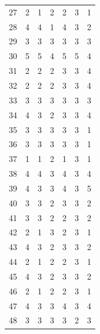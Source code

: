 \documentclass[spanish]{textolivre}
\begin{document}
\begin{longtable}{c c c c c c c}
27 & 2 & 1 & 2 & 2 & 3 & 1 \\
28 & 4 & 4 & 1 & 4 & 3 & 2 \\
29 & 3 & 3 & 3 & 3 & 3 & 3 \\
30 & 5 & 5 & 4 & 5 & 5 & 4 \\
31 & 2 & 2 & 2 & 3 & 3 & 4 \\
32 & 2 & 2 & 2 & 3 & 3 & 4 \\
33 & 3 & 3 & 3 & 3 & 3 & 3 \\
34 & 4 & 3 & 2 & 3 & 3 & 4 \\
35 & 3 & 3 & 3 & 3 & 3 & 1 \\
36 & 3 & 3 & 3 & 3 & 3 & 1 \\
37 & 1 & 1 & 2 & 1 & 3 & 1 \\
38 & 4 & 4 & 3 & 4 & 3 & 4 \\
39 & 4 & 3 & 3 & 4 & 3 & 5 \\
40 & 3 & 3 & 2 & 3 & 3 & 2 \\
41 & 3 & 3 & 2 & 2 & 3 & 2 \\
42 & 2 & 1 & 3 & 2 & 3 & 1 \\
43 & 4 & 3 & 2 & 3 & 3 & 2 \\
44 & 2 & 1 & 2 & 2 & 3 & 1 \\
45 & 4 & 3 & 2 & 3 & 3 & 2 \\
46 & 2 & 1 & 2 & 2 & 3 & 1 \\
47 & 4 & 3 & 3 & 4 & 3 & 4 \\
48 & 3 & 3 & 3 & 3 & 2 & 3 \\

\end{longtable}
\end{document}
